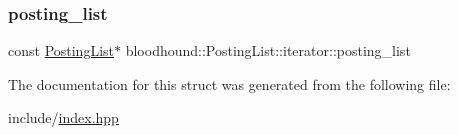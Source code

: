 \mbox{\label{structbloodhound_1_1PostingList_1_1iterator_a3a9afedb85f883831ee68fee0611ca92}} 
\subsubsection{\texorpdfstring{posting\+\_\+list}{posting\_list}}
{\footnotesize\ttfamily const \hyperlink{classbloodhound_1_1PostingList}{Posting\+List}$\ast$ bloodhound\+::\+Posting\+List\+::iterator\+::posting\+\_\+list}



The documentation for this struct was generated from the following file\+:\begin{DoxyCompactItemize}
\item 
include/\hyperlink{index_8hpp}{index.\+hpp}\end{DoxyCompactItemize}
